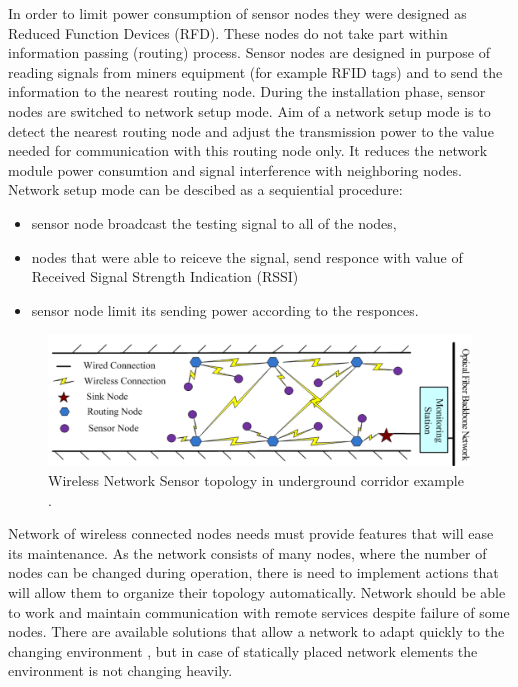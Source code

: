\documentclass[../main.tex]{subfiles}
\begin{document}
In order to limit power consumption of sensor nodes they were designed as Reduced Function Devices (RFD). These nodes do not take part within information passing (routing) process. Sensor nodes are designed in purpose of reading signals from miners equipment (for example RFID tags) and to send the information to the nearest routing node. During the installation phase, sensor nodes are switched to network setup mode.  Aim of a network setup mode is to detect the nearest routing node and adjust the transmission power to the value needed for communication with this routing node only. It reduces the network module power consumtion and signal interference with neighboring nodes. Network setup mode can be descibed as a sequiential procedure:
\begin{itemize}
	\item sensor node broadcast the testing signal to all of the nodes,
	\item nodes that were able to reiceve the signal, send responce with value of Received Signal Strength Indication (RSSI)
	\item sensor node limit its sending power according to the responces.
\end{itemize}

\begin{figure}[!htbp]
\includegraphics[width=\textwidth]{pictures/wsn_topology.png}
\centering
\caption{Wireless Network Sensor topology in underground corridor example \cite{WSN_monitoring}. }
\label{fig:wsn_topology}
\end{figure}

Network of wireless connected nodes needs must provide features that will ease its maintenance. As the network consists of many nodes, where the number of nodes can be changed during operation, there is need to implement actions that will allow them to organize their topology automatically. Network should be able to work and maintain communication with remote services despite failure of some nodes. There are available solutions that allow a network to adapt quickly to the changing environment \cite{WSN_collective}, but in case of statically placed network elements the environment is not changing heavily.
\end{document}
